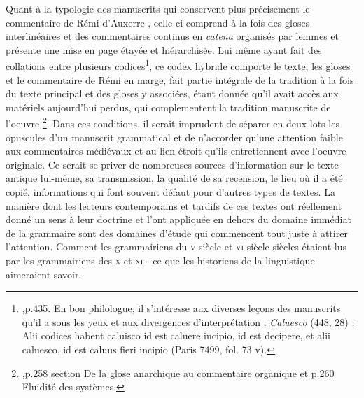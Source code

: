 \documentclass[a4paper, twoside, 12pt]{book}
\begin{document}
Quant à la typologie des manuscrits qui conservent plus précisement le commentaire de Rémi d'Auxerre , celle-ci comprend à la fois des gloses interlinéaires et des commentaires continus en \textit{catena} organisés par lemmes et présente une mise en page étayée et hiérarchisée. Lui même ayant fait des \og{} collations\fg{} entre plusieurs codices\footnote{ \cite{jeudy1974manuscrits},p.435. En bon philologue, il s'intéresse aux diverses leçons  des  manuscrits qu'il a sous les yeux et aux divergences d'interprétation : \textit{Caluesco }(448, 28) : \og{} Alii codices habent caluisco id est caluere incipio, id est decipere, et alii caluesco, id  est caluus fieri incipio \fg{} (Paris 7499, fol. 73 v).}, ce codex hybride comporte le texte, les gloses et le commentaire de Rémi en marge, fait partie intégrale de la tradition à la fois du texte principal et des gloses y associées, étant donnée qu'il avait accès aux matériels aujourd'hui perdus, qui complementent la tradition manuscrite de l'oeuvre \footnote{\cite{holtz1978typologie},p.258 section \og{} De la glose anarchique au commentaire organique\fg{} et p.260 \og{} Fluidité des systèmes\fg{}.}. Dans ces conditions, il serait imprudent de séparer en deux lots les opuscules d'un manuscrit grammatical et de n'accorder qu'une attention faible aux commentaires médiévaux et au lien étroit qu'ils entretiennent avec l'oeuvre originale. Ce serait se priver de nombreuses sources d'information sur le texte antique lui-même, sa transmission, la qualité de sa recension, le lieu où il a été copié, informations qui font souvent défaut pour d'autres types de textes. La manière dont les lecteurs contemporains et tardifs de ces textes ont réellement donné un sens à leur doctrine et l'ont appliquée en dehors du domaine immédiat de la grammaire sont des domaines d'étude qui commencent tout juste à attirer l'attention. Comment les grammairiens du \textsc{v}\ieme{} siècle et \textsc{vi}\ieme{} siècle siècles étaient lus par les grammairiens des \textsc{x}\ieme{} et \textsc{xi}\ieme{} - ce que les historiens de la linguistique aimeraient savoir.\\
\end{document}
